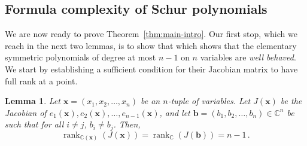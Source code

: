 \documentclass[10pt,a4paper]{article}
\newtheorem{lemma}[theorem]{Lemma}
\theoremstyle{definition}
\newcommand{\F}{\mathbb C}
\newcommand{\vb}{\mathbf b}
\newcommand{\vx}{\mathbf x}
\DeclareMathOperator{\rank}{rank}
\begin{document}
\subsection{Formula complexity of Schur polynomials}
\label{sec:schur-formula-complexity}
%
%
%
%
%
%
%
%
%
%
%
%
%
%
We are now ready to prove Theorem~\ref{thm:main-intro}. Our first stop, which we reach in the next two lemmas, is to show that which shows that the elementary symmetric polynomials of degree at most $n-1$ on $n$ variables are \emph{well behaved}. We start by establishing a sufficient condition for their Jacobian matrix to have full rank at a point. 
\begin{lemma}\label{lem:jacobian of esyms}
Let $\vx = (x_1, x_2, \ldots, x_n)$ be an $n$-tuple of variables. Let $J(\vx)$ be the Jacobian of $e_1(\vx), e_2(\vx), \ldots, e_{n-1}(\vx)$, and let $\vb = (b_1, b_2, \ldots, b_n) \in \F^n$ be such that for all $i \neq j$, $b_i \neq b_j$. Then, 
\[
\rank_{\F(\vx)}\left(J(\vx) \right) = \rank_{\F}(J(\vb)) = n-1 \, .
\]
\end{lemma}
\end{document}
